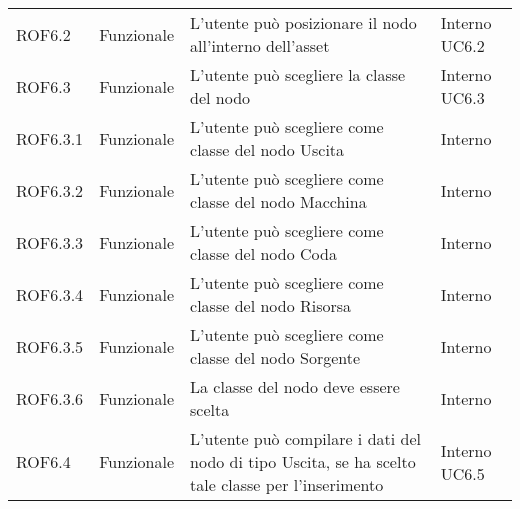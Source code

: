\begin{longtable}{p{2cm}!{\VRule[1pt]}p{2cm}!{\VRule[1pt]}p{5cm}!{\VRule[1pt]}p{1.5cm}}
	ROF6.2                           & Funzionale\newline               & L'utente può posizionare il nodo all'interno dell'asset                                                                  & Interno \newline UC6.2       
	\\
	ROF6.3                           & Funzionale\newline               & L'utente può scegliere la classe del nodo                                                                                & Interno \newline UC6.3       
	\\
	ROF6.3.1                         & Funzionale\newline               & L'utente può scegliere come classe del nodo Uscita                                                                       & Interno                      \\
	ROF6.3.2                         & Funzionale\newline               & L'utente può scegliere come classe del nodo Macchina                                                                     & Interno                      \\
	ROF6.3.3                         & Funzionale\newline               & L'utente può scegliere come classe del nodo Coda                                                                         & Interno                      \\
	ROF6.3.4                         & Funzionale\newline               & L'utente può scegliere come classe del nodo Risorsa                                                                      & Interno                      \\
	ROF6.3.5                         & Funzionale\newline               & L'utente può scegliere come classe del nodo Sorgente                                                                     & Interno                      \\
	ROF6.3.6                         & Funzionale\newline               & La classe del nodo deve essere scelta                                                                                     & Interno                      \\
	ROF6.4                           & Funzionale\newline               & L'utente può compilare i dati del nodo di tipo Uscita, se ha scelto tale classe per l'inserimento                        & Interno \newline UC6.5       

\end{longtable}
